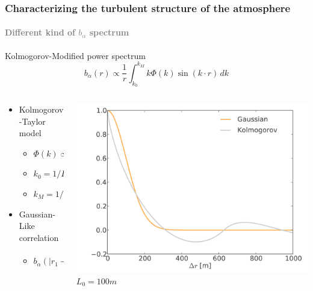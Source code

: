 \documentclass[aspectratio=169]{beamer}
\begin{document}
\begin{frame}
    \frametitle{Characterizing the turbulent structure of the atmosphere}
    \framesubtitle{\textcolor{gray}{Different kind of $b_\alpha$ spectrum}}
    \begin{block}{Kolmogorov-Modified power spectrum}
        \begin{equation}
            b_\alpha(r) \propto \frac{1}{r}\int_{k_0}^{k_M} k \Phi(k) \sin(k\cdot r)\,dk
        \end{equation}
    \end{block}

    \begin{columns}
        \begin{column}{0.5\textwidth}
            \begin{itemize}[<+->]
                \item Kolmogorov-Taylor model
                \begin{itemize}
                    \item $\Phi(k) \propto k^{-11/3}$
                    \item $k_0 = 1/L_0$
                    \item $k_M=1/l_0$
                \end{itemize}
                \item Gaussian-Like correlation
                \begin{itemize}
                    \item $b_\alpha(\lvert r_1 - r_2\rvert) = \exp\left[-\frac{\lvert r_1 - r_2\rvert^2}{2(L_0/3)^2}\right]$
                \end{itemize}
            \end{itemize}
        \end{column}
        \begin{column}{0.5\textwidth}
            \centering
            \includegraphics[scale=0.20]{Kol_Gauss.png}\\
            $L_0 = 100m$
        \end{column}

    \end{columns}
\end{frame}
\end{document}
